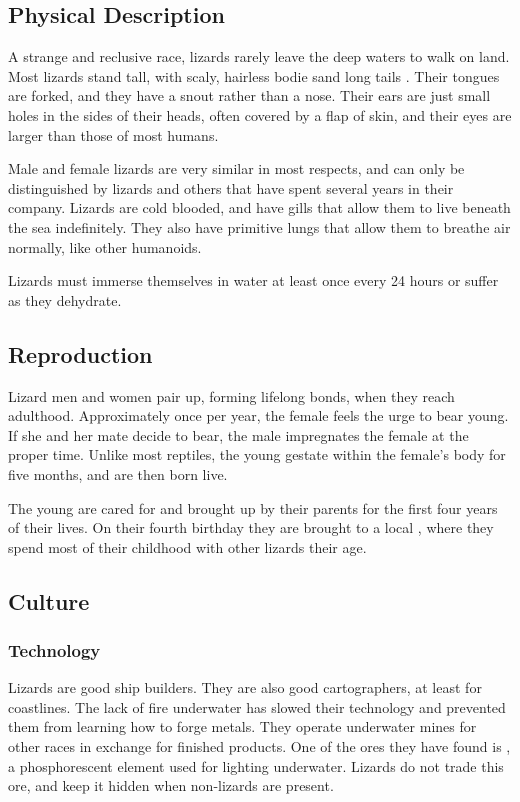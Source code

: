 \begin{multicols*}{2}
\subsection{Physical Description}
A strange and reclusive race, lizards rarely leave the deep waters to walk on land. Most lizards stand  tall, with scaly, hairless bodie sand long tails . Their
tongues are forked, and they have a snout rather than a nose. Their ears are just small holes in the sides of their heads, often covered by a flap of skin, and their eyes are larger than
those of most humans. 

Male and female lizards are very similar in most respects, and can only be distinguished by lizards and others that have spent several years in their company. Lizards are cold blooded, and have gills that allow them to live beneath the sea indefinitely. They also have primitive lungs that allow them to breathe air normally, like other humanoids.

Lizards must immerse themselves in water at least once every 24 hours or suffer  as they dehydrate.
\subsection{Reproduction}
Lizard men and women pair up, forming lifelong bonds, when they reach adulthood. Approximately once per year, the female feels the urge to bear young. If she and her mate decide to bear, the male impregnates the female at the proper time. Unlike most reptiles, the young gestate within the female's body for five months, and are then born live.

The young are cared for and brought up by their parents for the first four years of their lives. On their fourth birthday they are brought to a local , where they spend most of their childhood with other lizards their age.
\subsection{Culture}
\subsubsection{Technology}
Lizards are good ship builders. They are also good cartographers, at least for coastlines. The lack of fire underwater has slowed their technology and prevented them
from learning how to forge metals. They operate underwater mines for other races in exchange for finished products. One of the ores they have found is , a phosphorescent element used for lighting underwater. Lizards do not trade this ore, and keep it hidden when non-lizards are present.

\end{multicols*}
